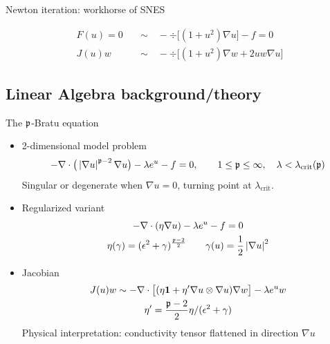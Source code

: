 \begin{frame}{Newton iteration: workhorse of SNES}
\begin{example}
\begin{align*}
      F(u)=0 \quad &\sim\quad -\div\big[ (1+u^2) \nabla u \big] - f = 0 \\
      J(u)w \quad &\sim\quad  -\div\big[(1+u^2)\nabla w + 2uw\nabla u \Big]
    \end{align*}
  \end{example}
\end{frame}

\subsection{Linear Algebra background/theory}





\begin{frame}{The ${\mathfrak p}$-Bratu equation}
  \begin{itemize}
  \item 2-dimensional model problem
    \begin{equation*}
      -\nabla \cdot \big(\left\lvert \nabla u \right\rvert^{{\mathfrak p}-2} \nabla u \big) - \lambda e^u - f = 0, \qquad 1 \le {\mathfrak p} \le \infty, \quad \lambda < \lambda_{\text{crit}}({\mathfrak p})
    \end{equation*}
    Singular or degenerate when $\nabla u = 0$, turning point at $\lambda_{\text{crit}}$.
  \item Regularized variant
    \begin{gather*}
      -\nabla \cdot (\eta \nabla u) - \lambda e^u - f = 0 \\
      \eta(\gamma) = (\epsilon^2 + \gamma)^{\frac{{\mathfrak p}-2}{2}} \qquad \gamma(u) = {\frac 1 2} \left\lvert \nabla u \right\rvert^2
    \end{gather*}
  \item Jacobian
    \begin{gather*}
      J(u) w \sim -\nabla \cdot \big[ (\eta \bm 1 + \eta' \nabla u \otimes \nabla u) \nabla w \big] - \lambda e^u w \\
      \eta' = \frac{{\mathfrak p}-2}{2} \eta / (\epsilon^2 + \gamma)
    \end{gather*}
    Physical interpretation: conductivity tensor flattened in direction $\nabla u$ %
  \end{itemize}
\end{frame}

